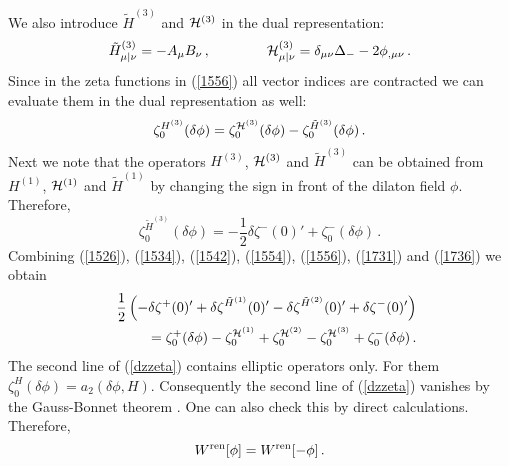 \documentclass[a4paper,12pt]{article}
\begin{document}
We also introduce  $\tilde H^{(3)}$ and ${\cal H}^{(3)}$
in the dual representation:
\begin{equation}
\tilde H^{(3)}_{\mu |\nu}=-A_\mu B_\nu \,,\qquad\qquad
{\cal H}^{(3)}_{\mu |\nu}=\delta_{\mu\nu}\Delta_- -2\phi_{,\mu\nu} \,.
\label{allH3}
\end{equation}
Since in the zeta functions in (\ref{1556}) all vector indices
are contracted we can evaluate them in the dual representation
as well:
\begin{equation}
\zeta_0^{H^{(3)}} (\delta\phi )=
\zeta_0^{{\cal H}^{(3)}} (\delta\phi )-
\zeta_0^{\tilde H^{(3)}} (\delta\phi )  \,.
\label{1731}
\end{equation}
Next we note that the operators $H^{(3)}$, ${\cal H}^{(3)}$ and
$\tilde H^{(3)}$ can be obtained from $H^{(1)}$, ${\cal H}^{(1)}$ and
$\tilde H^{(1)}$ by changing the sign in front of the dilaton
field $\phi$. Therefore,
\begin{equation}
\zeta_0^{\tilde H^{(3)}} (\delta\phi ) =-\frac 12 \delta \zeta^-(0)'
+\zeta^-_0(\delta\phi ) \,.\label{1736}
\end{equation}
Combining (\ref{1526}), (\ref{1534}), (\ref{1542}), (\ref{1554}),
(\ref{1556}), (\ref{1731}) and (\ref{1736}) we obtain
\begin{eqnarray}
&&\frac 12 \left( -\delta\zeta^+(0)' +\delta\zeta^{\tilde H^{(1)}}(0)'
-\delta\zeta^{\tilde H^{(2)}}(0)' + \delta\zeta^-(0)' \right)
\nonumber \\
&&\quad =\zeta_0^+ (\delta\phi ) -
\zeta_0^{{\cal H}^{(1)}} +\zeta_0^{{\cal H}^{(2)}}
-\zeta_0^{{\cal H}^{(3)}} +\zeta_0^- (\delta\phi ) \,.
\label{dzzeta}
\end{eqnarray}
The second line of (\ref{dzzeta}) contains elliptic operators
only. For them $\zeta_0^H (\delta\phi )=a_2(\delta\phi ,H)$. 
Consequently the second line of (\ref{dzzeta}) vanishes
by the Gauss-Bonnet theorem \cite{Gilkey95}. One can also check
this by direct calculations. Therefore,
\begin{equation}
W^{\mbox{\scriptsize ren}}[\phi ]=
W^{\mbox{\scriptsize ren}} [-\phi ] \,.
\label{symWren4}
\end{equation}

\end{document}
